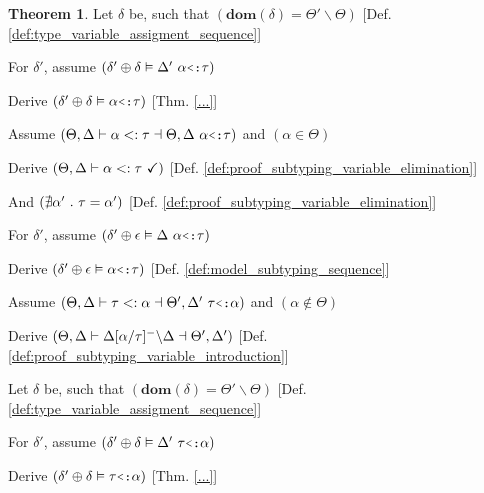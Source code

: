 \documentclass[acmsmall]{acmart}
\theoremstyle{definition}
\newtheorem{theorem}{Theorem}[section]
\begin{document}
\begin{theorem}
  \item \I \N Let $\delta$ be, such that $(
    \textbf{dom}(\delta) = \Theta' \backslash \Theta
  )$ [Def. \ref{def:type_variable_assigment_sequence}]

  \item \I \N For $\delta'$, assume $(
    \delta' \oplus \delta \satisfies \Delta'\ \alpha \J{<:} \tau
  )$ 
  \item \I\I \N Derive $(
    \delta' \oplus \delta \satisfies \alpha \J{<:} \tau
  )$ [Thm. \ref{...}]


  \item \N Assume $(
    \Theta, \Delta \entails 
    \alpha \subtypes \tau
    \given \Theta, \Delta\ \alpha \J{<:} \tau
  )$ and $(
    \alpha \in \Theta 
  )$
  \item \I \N Derive $(
    \Theta, \Delta \vdash \alpha <: \tau \ \checkmark
  )$ [Def. \ref{def:proof_subtyping_variable_elimination}]
  \item \I \N And $(
    \nexists \alpha'  \ .\  \tau = \alpha'
  )$ [Def. \ref{def:proof_subtyping_variable_elimination}]

  \item \I \N For $\delta'$, assume $(
    \delta' \oplus \epsilon \satisfies \Delta\ \alpha \J{<:} \tau 
  )$ 
  \item \I\I \N Derive $(
    \delta' \oplus \epsilon \satisfies \alpha \J{<:} \tau
  )$ [Def. \ref{def:model_subtyping_sequence}]


  \item \N Assume $(
    \Theta, \Delta \entails 
    \tau \subtypes \alpha \given \Theta', \Delta'\ \tau\J{<:}\alpha
  )$ and $(
    \alpha \notin \Theta
  )$
  \item \I \N Derive $(
    \Theta, \Delta \vdash 
    \Delta[\alpha\slash\tau]^{-} \backslash \Delta \dashv \Theta', \Delta'
  )$ [Def. \ref{def:proof_subtyping_variable_introduction}]

  \item \I \N Let $\delta$ be, such that $(
    \textbf{dom}(\delta) = \Theta' \backslash \Theta
  )$ [Def. \ref{def:type_variable_assigment_sequence}]

  \item \I \N For $\delta'$, assume $(
    \delta' \oplus \delta \satisfies \Delta'\ \tau \J{<:} \alpha
  )$ 
  \item \I\I \N Derive $(
    \delta' \oplus \delta \satisfies \tau \J{<:} \alpha
  )$ [Thm. \ref{...}]


\end{theorem}
\end{document}
